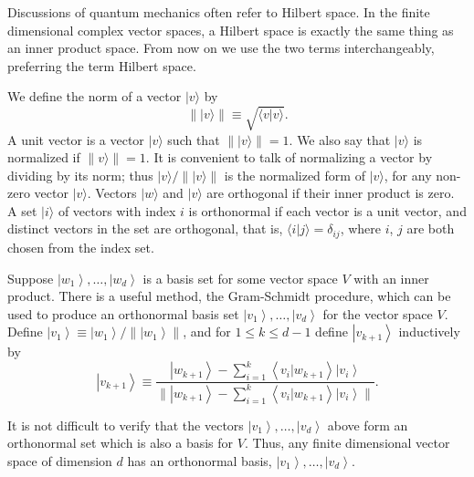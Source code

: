 Discussions of quantum mechanics often refer to Hilbert space. In the finite dimensional complex vector spaces, a Hilbert space is exactly the same thing as an inner product space. From now on we use the two terms interchangeably, preferring the term Hilbert space.


We define the norm of a vector $|v\rangle$ by
$$
\||v\rangle \| \equiv \sqrt{\langle v | v\rangle}.
$$
A unit vector is a vector $|v\rangle$ such that $\||v\rangle \|=1$. We also say that $|v\rangle$ is normalized if $\| v\rangle \|=1$. It is convenient to talk of normalizing a vector by dividing by its norm; thus $|v\rangle / \||v\rangle \|$ is the normalized form of $|v\rangle$, for any non-zero vector $|v\rangle$. 
Vectors $|w\rangle$ and $|v\rangle$ are orthogonal if their inner product is zero. A set $|i\rangle$ of vectors with index $i$ is orthonormal if each vector is a unit vector, and distinct vectors in the set are orthogonal, that is, $\langle i | j\rangle=\delta_{i j}$, where $i$, $j$ are both chosen from the index set.


\begin{proposition}
    Suppose $\left|w_{1}\right\rangle, \ldots,\left|w_{d}\right\rangle$ is a basis set for some vector space $V$ with an inner product. There is a useful method, the Gram-Schmidt procedure, which can be used to produce an orthonormal basis set $\left|v_{1}\right\rangle, \ldots,\left|v_{d}\right\rangle$ for the vector space $V$. Define $\left|v_{1}\right\rangle \equiv\left|w_{1}\right\rangle / \|\left|w_{1}\right\rangle \|$, and for $1 \leq k \leq d-1$ define $\left|v_{k+1}\right\rangle$ inductively by
$$
\left|v_{k+1}\right\rangle \equiv \frac{\left|w_{k+1}\right\rangle-\sum_{i=1}^{k}\left\langle v_{i} | w_{k+1}\right\rangle\left|v_{i}\right\rangle}{\|\left|w_{k+1}\right\rangle-\sum_{i=1}^{k}\left\langle v_{i} | w_{k+1}\right\rangle\left|v_{i}\right\rangle \|}.
$$
\end{proposition}

It is not difficult to verify that the vectors $\left|v_{1}\right\rangle, \ldots,\left|v_{d}\right\rangle$ above form an orthonormal set which is also a basis for $V$. Thus, any finite dimensional vector space of dimension $d$ has an orthonormal basis, $\left|v_{1}\right\rangle, \ldots,\left|v_{d}\right\rangle$.

